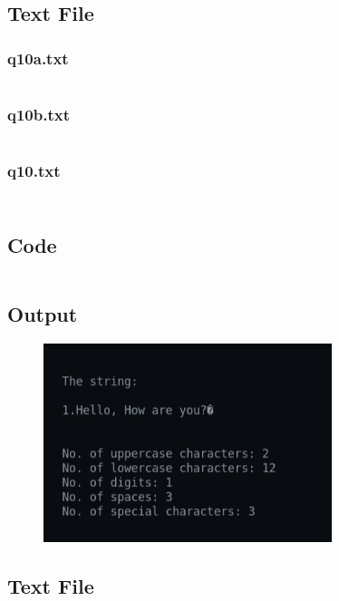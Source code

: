 \documentclass[12pt]{article}
\begin{document}
\subsection{Text File}
\subsubsection{q10a.txt}
\inputminted{c}{q10a.txt}
\subsubsection{q10b.txt}
\inputminted{c}{q10b.txt}
\subsubsection{q10.txt}
\inputminted{c}{q10.txt}

\newpage
\section{}
\subsection{Code}
\inputminted{c}{q11.c}
\newpage
\subsection{Output}
\begin{figure}[h]
    \centering
    \includegraphics[width=0.75\textwidth]{11.png}
\end{figure}
\subsection{Text File}
\inputminted{c}{q11.txt}

\newpage
\section{}
\end{document}
